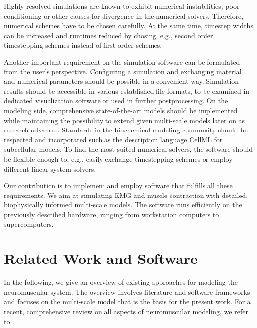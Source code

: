 Highly resolved simulations are known to exhibit numerical instabilities, poor conditioning or other causes for divergence in the numerical solvers. Therefore, numerical schemes have to be chosen carefully. At the same time, timestep widths can be increased and runtimes reduced by chosing, e.g., second order timestepping schemes instead of first order schemes.

Another important requirement on the simulation software can be formulated from the user's perspective. 
Configuring a simulation and exchanging material and numerical parameters should be possible in a convenient way. Simulation results should be accessible in various established file formats, to be examined in dedicated visualization software or used in further postprocessing. On the modeling side, comprehensive state-of-the-art models should be implemented while maintaining the possibility to extend given multi-scale models later on as research advances. 
Standards in the biochemical modeling community should be respected and incorporated such as the description language CellML \cite{Cellml2003,Lloyd2004} for subcellular models.
To find the most suited numerical solvers, the software should be flexible enough to, e.g., easily exchange timestepping schemes or employ different linear system solvers.

Our contribution is to implement and employ software that fulfills all these requirements. We aim at
simulating EMG and muscle contraction with detailed, biophysically informed multi-scale models. The software runs efficiently on the previously described hardware, ranging from workstation computers to supercomputers.

\section{Related Work and Software}\label{sec:intro_related_works}

In the following, we give an overview of existing approaches for modeling the neuromuscular system. The overview involves literature and software frameworks and focuses on the multi-scale model that is the basis for the present work. For a recent, comprehensive review on all aspects of neuromuscular modeling, we refer to \cite{Rohrle2019Review}.

